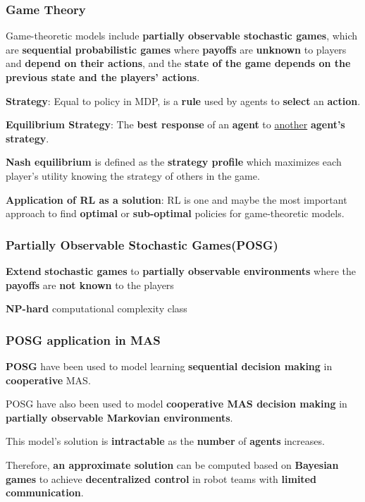 \documentclass{beamer}
\begin{document}
	\begin{frame}
		\frametitle{Game Theory}
		Game-theoretic models include \textbf{partially observable stochastic games}, which are \textbf{sequential probabilistic games} where \textbf{payoffs} are \textbf{unknown} to players and \textbf{depend on their actions}, and the \textbf{state of the game depends on the previous state and the players’ actions}.
		
		\vspace{0.1in} 
		\textbf{Strategy}: Equal to policy in MDP, is a \textbf{rule} used by agents to \textbf{select} an \textbf{action}.
		
		\vspace{0.1in}
		\textbf{Equilibrium Strategy}: The \textbf{best response} of an \textbf{agent} to \underline{another} \textbf{agent’s strategy}. 
		
		\vspace{0.1in}
		\textbf{Nash equilibrium} is defined as the \textbf{strategy profile} which maximizes each player’s utility knowing the strategy of others in the game.
		
		\vspace{0.1in}
		\textbf{Application of RL as a solution}: RL is one and maybe the most important approach to find \textbf{optimal} or \textbf{sub-optimal} policies for game-theoretic models.
	\end{frame}

	\begin{frame}
		\frametitle{Partially Observable Stochastic Games(POSG)}
		\textbf{Extend} \textbf{stochastic games} to \textbf{partially observable environments} where the \textbf{payoffs} are \textbf{not known} to the players
		
		\vspace{0.1in}
		\textbf{NP-hard} computational complexity class
	\end{frame}

	\begin{frame}
		\frametitle{POSG application in MAS}
		\textbf{POSG} have been used to model learning \textbf{sequential decision making} in \textbf{cooperative} MAS.
		
		\vspace{0.1in}
		POSG have also been used to model \textbf{cooperative MAS decision making} in \textbf{partially observable Markovian environments}.
		
		\vspace{0.1in}
		This model’s solution is \textbf{intractable} as the \textbf{number} of \textbf{agents} increases. 
		
		\vspace{0.1in}
		Therefore, \textbf{an approximate solution} can be computed based on \textbf{Bayesian games} to achieve \textbf{decentralized control} in robot teams with \textbf{limited communication}.
	\end{frame}
\end{document}
